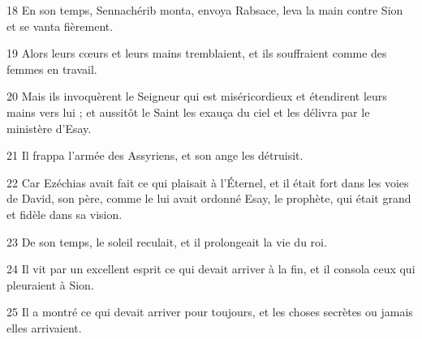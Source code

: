 \par 18 En son temps, Sennachérib monta, envoya Rabsace, leva la main contre Sion et se vanta fièrement.
\par 19 Alors leurs cœurs et leurs mains tremblaient, et ils souffraient comme des femmes en travail.
\par 20 Mais ils invoquèrent le Seigneur qui est miséricordieux et étendirent leurs mains vers lui ; et aussitôt le Saint les exauça du ciel et les délivra par le ministère d'Esay.
\par 21 Il frappa l'armée des Assyriens, et son ange les détruisit.
\par 22 Car Ezéchias avait fait ce qui plaisait à l'Éternel, et il était fort dans les voies de David, son père, comme le lui avait ordonné Esay, le prophète, qui était grand et fidèle dans sa vision.
\par 23 De son temps, le soleil reculait, et il prolongeait la vie du roi.
\par 24 Il vit par un excellent esprit ce qui devait arriver à la fin, et il consola ceux qui pleuraient à Sion.
\par 25 Il a montré ce qui devait arriver pour toujours, et les choses secrètes ou jamais elles arrivaient.


